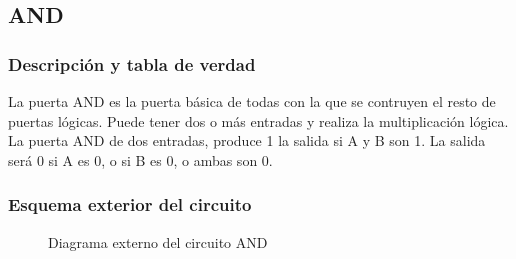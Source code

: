 \documentclass[12pt]{article}
\begin{document}
    \subsection{AND}
        \subsubsection{Descripción y tabla de verdad}
            La puerta AND es la puerta básica de todas con la que se contruyen el resto de puertas lógicas. Puede tener dos o más entradas y realiza la multiplicación lógica.
            La puerta AND de dos entradas, produce 1 la salida si A y B son 1. La salida será 0 si A es 0, o si B es 0, o ambas son 0. 
            \begin{table}[H]
            \centering
            \caption{Tabla de verdad de AND}
            \label{tab:AND}
            \end{table}
        \subsubsection{Esquema exterior del circuito}
            \begin{figure}[H]
                \centering
                
                \caption{Diagrama externo del circuito AND} \cite{diagram}
                \label{fig:enter-label}
            \end{figure}
        
\end{document}
